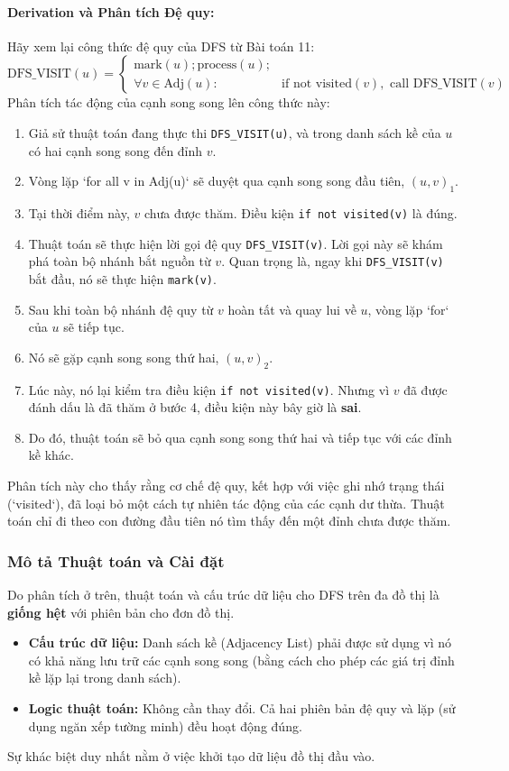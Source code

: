 \documentclass[a4paper,12pt]{article}
\begin{document}
\paragraph{Derivation và Phân tích Đệ quy:}
Hãy xem lại công thức đệ quy của DFS từ Bài toán 11:
\[ \text{DFS\_VISIT}(u) = \left\{ \begin{array}{ll}
    \text{mark}(u); \text{process}(u); & \\
    \forall v \in \text{Adj}(u): & \text{if not visited}(v), \text{ call } \text{DFS\_VISIT}(v)
\end{array} \right. \]
Phân tích tác động của cạnh song song lên công thức này:
\begin{enumerate}
    \item Giả sử thuật toán đang thực thi \texttt{DFS\_VISIT(u)}, và trong danh sách kề của $u$ có hai cạnh song song đến đỉnh $v$.
    \item Vòng lặp `for all v in Adj(u)` sẽ duyệt qua cạnh song song đầu tiên, $(u, v)_1$.
    \item Tại thời điểm này, $v$ chưa được thăm. Điều kiện \texttt{if not visited(v)} là đúng.
    \item Thuật toán sẽ thực hiện lời gọi đệ quy \texttt{DFS\_VISIT(v)}. Lời gọi này sẽ khám phá toàn bộ nhánh bắt nguồn từ $v$. Quan trọng là, ngay khi \texttt{DFS\_VISIT(v)} bắt đầu, nó sẽ thực hiện \texttt{mark(v)}.
    \item Sau khi toàn bộ nhánh đệ quy từ $v$ hoàn tất và quay lui về $u$, vòng lặp `for` của $u$ sẽ tiếp tục.
    \item Nó sẽ gặp cạnh song song thứ hai, $(u, v)_2$.
    \item Lúc này, nó lại kiểm tra điều kiện \texttt{if not visited(v)}. Nhưng vì $v$ đã được đánh dấu là đã thăm ở bước 4, điều kiện này bây giờ là \textbf{sai}.
    \item Do đó, thuật toán sẽ bỏ qua cạnh song song thứ hai và tiếp tục với các đỉnh kề khác.
\end{enumerate}
Phân tích này cho thấy rằng cơ chế đệ quy, kết hợp với việc ghi nhớ trạng thái (`visited`), đã loại bỏ một cách tự nhiên tác động của các cạnh dư thừa. Thuật toán chỉ đi theo con đường đầu tiên nó tìm thấy đến một đỉnh chưa được thăm.

\subsubsection{Mô tả Thuật toán và Cài đặt}
Do phân tích ở trên, thuật toán và cấu trúc dữ liệu cho DFS trên đa đồ thị là \textbf{giống hệt} với phiên bản cho đơn đồ thị.
\begin{itemize}
    \item \textbf{Cấu trúc dữ liệu:} Danh sách kề (Adjacency List) phải được sử dụng vì nó có khả năng lưu trữ các cạnh song song (bằng cách cho phép các giá trị đỉnh kề lặp lại trong danh sách).
    \item \textbf{Logic thuật toán:} Không cần thay đổi. Cả hai phiên bản đệ quy và lặp (sử dụng ngăn xếp tường minh) đều hoạt động đúng.
\end{itemize}
Sự khác biệt duy nhất nằm ở việc khởi tạo dữ liệu đồ thị đầu vào.
\end{document}
